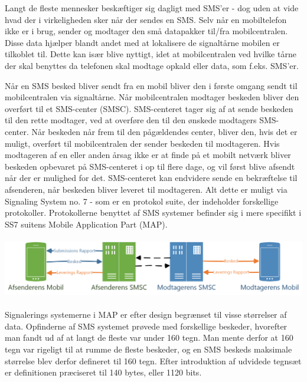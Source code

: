 Langt de fleste mennesker beskæftiger sig dagligt med SMS'er - dog uden at vide hvad der i virkeligheden sker når der sendes en SMS. Selv når en mobiltelefon ikke er i brug, sender og modtager den små datapakker til/fra mobilcentralen. Disse data hjælper blandt andet med at lokalisere de signaltårne mobilen er tilkoblet til. Dette kan især blive nyttigt, idet at mobilcentralen ved hvilke tårne der skal benyttes da telefonen skal modtage opkald eller data, som f.eks. SMS'er.

Når en SMS besked bliver sendt fra en mobil bliver den i første omgang sendt til mobilcentralen via signaltårne. Når mobilcentralen modtager beskeden bliver den overført til et SMS-center (SMSC). SMS-centeret tager sig af at sende beskeden til den rette modtager, ved at overføre den til den ønskede modtagers SMS-center. Når beskeden når frem til den pågældendes center, bliver den, hvis det er muligt, overført til mobilcentralen der sender beskeden til modtageren. Hvis modtageren af en eller anden årsag ikke er at finde på et mobilt netværk bliver beskeden opbevaret på SMS-centeret i op til flere dage, og vil først blive afsendt når der er mulighed for det. SMS-centeret kan endvidere sende en bekræftelse til afsenderen, når beskeden bliver leveret til modtageren. Alt dette er muligt via Signaling System no. 7 - som er en protokol suite, der indeholder forskellige protokoller. Protokollerne benyttet af SMS systemer befinder sig i mere specifikt i SS7 suitens Mobile Application Part (MAP). \cite{Pro_1} \cite{sms_max1}
\\
\\
\noindent
\includegraphics[width=\linewidth]{Billeder/Mobil.png}
\\
\\
Signalerings systemerne i MAP er efter design begrænset til visse størrelser af data. Opfinderne af SMS systemet prøvede med forskellige beskeder, hvorefter man fandt ud af at langt de fleste var under 160 tegn. Man mente derfor at 160 tegn var rigeligt til at rumme de fleste beskeder, og en SMS beskeds maksimale størrelse blev derfor defineret til 160 tegn. Efter introduktion af udvidede tegnsæt er definitionen præciseret til 140 bytes, eller 1120 bits. \cite{sms_max1} \cite{sms_max2}


